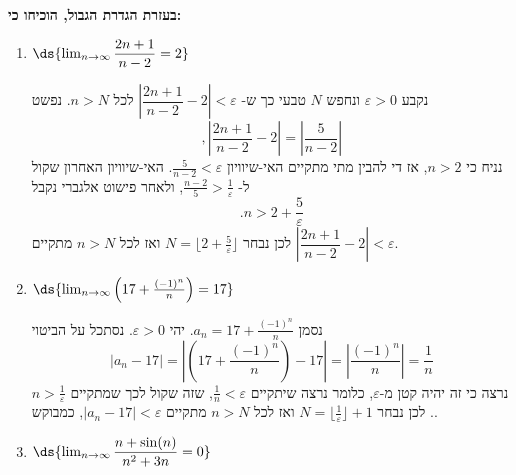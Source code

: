 \textbf{בעזרת הגדרת הגבול, הוכיחו כי:}
\begin{enumerate}
    \item $\ds{\lim_{n\to\infty}\dfrac{2n + 1}{n-2} =2}$
    
\begin{solbox}
    נקבע
    $\varepsilon>0$
    ונחפש
    $N$
    טבעי כך ש-
    $\left|\dfrac{2n + 1}{n-2}-2\right|<\varepsilon$
    לכל
    $n>N$.
    נפשט
    $$,\left|\dfrac{2n + 1}{n-2}-2\right|=\left|\dfrac{5}{n-2}\right|$$
    נניח כי
    $n>2$,
    אז די להבין מתי מתקיים האי-שיוויון
    $\frac{5}{n-2}<\varepsilon$.
    האי-שיוויון האחרון שקול ל-
    $\frac{n-2}{5}>\frac{1}{\varepsilon}$,
    ולאחר פישוט אלגברי נקבל
    $$.n>2+\frac{5}{\varepsilon}$$
לכן נבחר
    $N=\lfloor 2+\frac{5}{\varepsilon}\rfloor$
    ואז לכל
    $n>N$
    מתקיים
    $\left|\dfrac{2n + 1}{n-2}-2\right|<\varepsilon$.
\end{solbox}

    \item $\ds{\lim_{n\to\infty}\left(
    17+\frac{(-1)^n}{n}\right)=17}$

    \begin{solbox}
    נסמן
    $a_n=
    17+\frac{(-1)^n}{n}$.
       יהי
       $\varepsilon >0$.
       נסתכל על הביטוי
       $$|a_n-17|=\left|
       \left(
    17+\frac{(-1)^n}{n}\right)-17
       \right|=\left|
       \frac{(-1)^n}{n}
       \right|=\frac{1}{n}$$
       נרצה כי זה יהיה קטן מ-$\varepsilon$,
       כלומר נרצה שיתקיים
       $\frac{1}{n}<\varepsilon$,
       שזה שקול לכך שמתקיים
       $n>\frac{1}{\varepsilon}$.
       לכן נבחר
       $N=\lfloor\frac{1}{\varepsilon}\rfloor +1$
       ואז לכל
       $n>N$
       מתקיים
       $|a_n-17|<\varepsilon$,
       כמבוקש.
\end{solbox}

    \item
    $\ds{\lim_{n\to\infty}\dfrac{n + \sin(n)}{n^2+3n} = 0}$
      

\end{enumerate}
